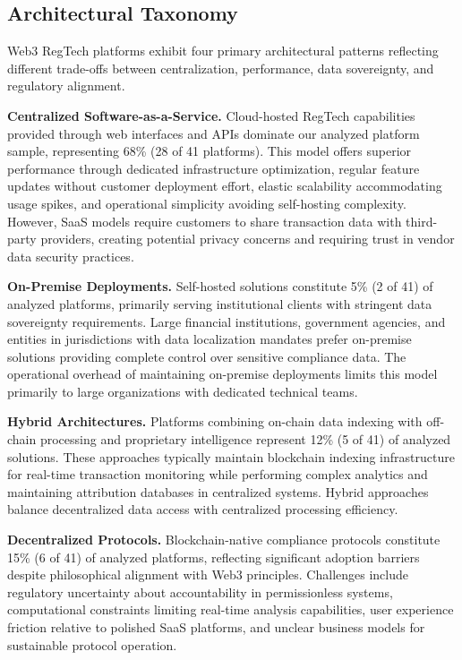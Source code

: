\subsection{Architectural Taxonomy}

Web3 RegTech platforms exhibit four primary architectural patterns reflecting different trade-offs between centralization, performance, data sovereignty, and regulatory alignment.

\noindent\textbf{Centralized Software-as-a-Service.}
Cloud-hosted RegTech capabilities provided through web interfaces and APIs dominate our analyzed platform sample, representing 68\% (28 of 41 platforms). This model offers superior performance through dedicated infrastructure optimization, regular feature updates without customer deployment effort, elastic scalability accommodating usage spikes, and operational simplicity avoiding self-hosting complexity. However, SaaS models require customers to share transaction data with third-party providers, creating potential privacy concerns and requiring trust in vendor data security practices.

\noindent\textbf{On-Premise Deployments.}
Self-hosted solutions constitute 5\% (2 of 41) of analyzed platforms, primarily serving institutional clients with stringent data sovereignty requirements. Large financial institutions, government agencies, and entities in jurisdictions with data localization mandates prefer on-premise solutions providing complete control over sensitive compliance data. The operational overhead of maintaining on-premise deployments limits this model primarily to large organizations with dedicated technical teams.

\noindent\textbf{Hybrid Architectures.}
Platforms combining on-chain data indexing with off-chain processing and proprietary intelligence represent 12\% (5 of 41) of analyzed solutions. These approaches typically maintain blockchain indexing infrastructure for real-time transaction monitoring while performing complex analytics and maintaining attribution databases in centralized systems. Hybrid approaches balance decentralized data access with centralized processing efficiency.

\noindent\textbf{Decentralized Protocols.}
Blockchain-native compliance protocols constitute 15\% (6 of 41) of analyzed platforms, reflecting significant adoption barriers despite philosophical alignment with Web3 principles. Challenges include regulatory uncertainty about accountability in permissionless systems, computational constraints limiting real-time analysis capabilities, user experience friction relative to polished SaaS platforms, and unclear business models for sustainable protocol operation.

